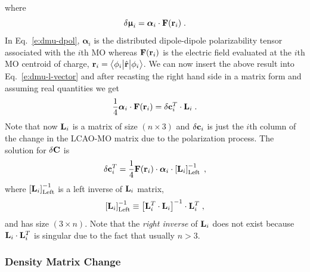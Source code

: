 \documentclass[aip,amsmath,amssymb,reprint,floatfix]{revtex4-1}
\newcommand{\tbraket}[3]{\ensuremath{\bigl\langle {#1} \bigl\lvert {#2} \bigl\lvert {#3} \bigr\rangle}}
\newcommand{\BM}[1]{\bm{#1}}
\begin{document}
%
where
%
\begin{equation} \label{e:dmu-dpol}
 \delta {\BM{\upmu}}_i = {\BM{\alpha}}_i \cdot {\bf F}({\bf r}_i) \;.
\end{equation}
%
In Eq.~\eqref{e:dmu-dpol}, ${\BM{\alpha}}_i$ is the distributed dipole\hyp{}dipole polarizability tensor
associated with the $i$th MO whereas ${\bf F}({\bf r}_i)$ is the electric field evaluated at the $i$th MO centroid of charge,
${\bf r}_i = \tbraket{\phi_i}{\hat{\bf r}}{\phi_i}$.
We can now insert the above result into Eq.~\eqref{e:dmu-l-vector} 
and after recasting the right hand side in a matrix form
and assuming real quantities
we get
%
\begin{equation} \label{e:dmu-l-vector-mo-transform-X}
 \frac{1}{4} {\BM{\alpha}}_i \cdot {\bf F}({\bf r}_i) 
   =
   \delta {\bf c}_i^T \cdot {\bf L}_i \;.
\end{equation}
%
Note that now ${\bf L}_i$ is a matrix of size $(n \times 3)$ and $\delta{\bf c}_i$ is just the $i$th column of the
change in the LCAO-MO matrix due to the polarization process.
The solution for $\delta {\bf C}$ is
%
\begin{equation} \label{e:mu-ind.matrix.linear.solution}
  \delta {\bf c}_i^T = \frac{1}{4}
            {\bf F}({\bf r}_i)  \cdot {\BM{\alpha}}_i \cdot 
                    \left[ {\bf L}_i  \right]^{-1}_{\rm Left} \;,
\end{equation}
%
where $\left[ {\bf L}_i  \right]^{-1}_{\rm Left}$ is a left inverse
of ${\bf L}_i$ matrix,
%
\begin{equation} 
      \left[ {\bf L}_i  \right]^{-1}_{\rm Left}   \equiv
       \left[ {\bf L}_i^T \cdot {\bf L}_i \right]^{-1} \cdot {\bf L}_i^T   \;,
\end{equation}
%
and has size $(3\times n)$. Note that the \emph{right inverse} of ${\bf L}_i$
does not exist because ${\bf L}_i \cdot {\bf L}_i^T$ is singular due to the fact that usually
$n > 3$.

\subsubsection{Density Matrix Change}
\end{document}

